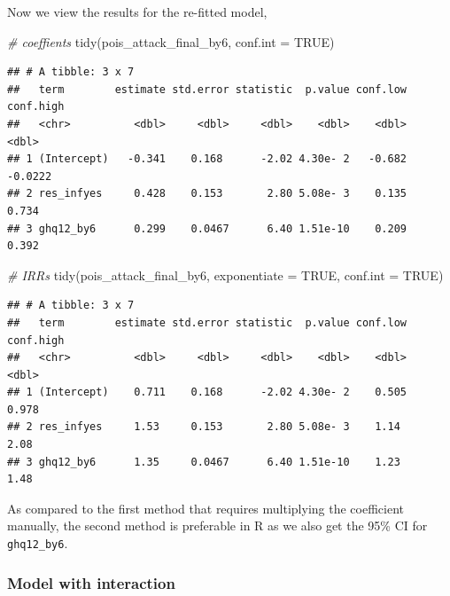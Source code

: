 \documentclass[
  10pt,
]{krantz}
\newenvironment{Shaded}{\begin{snugshade}}{\end{snugshade}}
\newcommand{\AttributeTok}[1]{\textcolor[rgb]{0.77,0.63,0.00}{#1}}
\newcommand{\CommentTok}[1]{\textcolor[rgb]{0.56,0.35,0.01}{\textit{#1}}}
\newcommand{\ConstantTok}[1]{\textcolor[rgb]{0.00,0.00,0.00}{#1}}
\newcommand{\FunctionTok}[1]{\textcolor[rgb]{0.00,0.00,0.00}{#1}}
\newcommand{\NormalTok}[1]{#1}
\begin{document}
Now we view the results for the re-fitted model,

\begin{Shaded}
\begin{Highlighting}[]
\CommentTok{\# coeffients}
\FunctionTok{tidy}\NormalTok{(pois\_attack\_final\_by6, }\AttributeTok{conf.int =} \ConstantTok{TRUE}\NormalTok{)}
\end{Highlighting}
\end{Shaded}

\begin{verbatim}
## # A tibble: 3 x 7
##   term        estimate std.error statistic  p.value conf.low conf.high
##   <chr>          <dbl>     <dbl>     <dbl>    <dbl>    <dbl>     <dbl>
## 1 (Intercept)   -0.341    0.168      -2.02 4.30e- 2   -0.682   -0.0222
## 2 res_infyes     0.428    0.153       2.80 5.08e- 3    0.135    0.734 
## 3 ghq12_by6      0.299    0.0467      6.40 1.51e-10    0.209    0.392
\end{verbatim}

\begin{Shaded}
\begin{Highlighting}[]
\CommentTok{\# IRRs}
\FunctionTok{tidy}\NormalTok{(pois\_attack\_final\_by6, }\AttributeTok{exponentiate =} \ConstantTok{TRUE}\NormalTok{, }\AttributeTok{conf.int =} \ConstantTok{TRUE}\NormalTok{)}
\end{Highlighting}
\end{Shaded}

\begin{verbatim}
## # A tibble: 3 x 7
##   term        estimate std.error statistic  p.value conf.low conf.high
##   <chr>          <dbl>     <dbl>     <dbl>    <dbl>    <dbl>     <dbl>
## 1 (Intercept)    0.711    0.168      -2.02 4.30e- 2    0.505     0.978
## 2 res_infyes     1.53     0.153       2.80 5.08e- 3    1.14      2.08 
## 3 ghq12_by6      1.35     0.0467      6.40 1.51e-10    1.23      1.48
\end{verbatim}

As compared to the first method that requires multiplying the coefficient manually, the second method is preferable in R as we also get the 95\% CI for \texttt{ghq12\_by6}.

\hypertarget{model-with-interaction}{%
\subsubsection*{\texorpdfstring{Model with interaction}{Model with interaction}}\label{model-with-interaction}}
\end{document}
